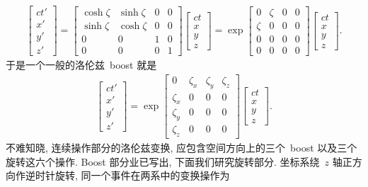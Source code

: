 \begin{align}
\left[
\begin{array}{l}
ct'\\x'\\y'\\z'
\end{array}
\right]=
\left[
\begin{array}{cccc}
\cosh\zeta&\sinh\zeta&0&0\\
\sinh\zeta&\cosh\zeta&0&0\\
0&0&1&0\\
0&0&0&1
\end{array}
\right]
\left[
\begin{array}{l}
ct\\x\\y\\z
\end{array}
\right]
=\exp\left[
\begin{array}{cccc}
0&\zeta&0&0\\
\zeta&0&0&0\\
0&0&0&0\\
0&0&0&0
\end{array}
\right]
\left[
\begin{array}{l}
ct\\x\\y\\z
\end{array}
\right].
\end{align}
于是一个一般的洛伦兹~boost 就是
\begin{align}
\left[
\begin{array}{l}
ct'\\x'\\y'\\z'
\end{array}
\right]
=\exp\left[
\begin{array}{cccc}
0&\zeta_x&\zeta_y&\zeta_z\\
\zeta_x&0&0&0\\
\zeta_y&0&0&0\\
\zeta_z&0&0&0
\end{array}
\right]
\left[
\begin{array}{l}
ct\\x\\y\\z
\end{array}
\right].
\end{align}
不难知晓, 连续操作部分的洛伦兹变换, 应包含空间方向上的三个~boost 以及三个旋转这六个操作. Boost 部分业已写出, 下面我们研究旋转部分. 坐标系绕~$z$ 轴正方向作逆时针旋转, 同一个事件在两系中的变换操作为
